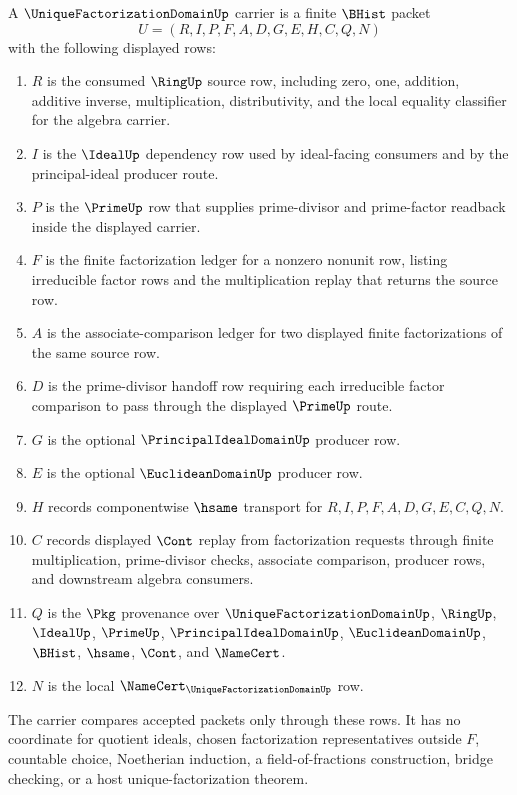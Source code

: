 \begin{definition}
\label{def:unique-factorization-domain-carrier}
A $\UniqueFactorizationDomainUp$ carrier is a finite $\BHist$ packet
$$
U=(R,I,P,F,A,D,G,E,H,C,Q,N)
$$
with the following displayed rows:
\begin{enumerate}
\item $R$ is the consumed $\RingUp$ source row, including zero, one, addition, additive inverse, multiplication, distributivity, and the local equality classifier for the algebra carrier.
\item $I$ is the $\IdealUp$ dependency row used by ideal-facing consumers and by the principal-ideal producer route.
\item $P$ is the $\PrimeUp$ row that supplies prime-divisor and prime-factor readback inside the displayed carrier.
\item $F$ is the finite factorization ledger for a nonzero nonunit row, listing irreducible factor rows and the multiplication replay that returns the source row.
\item $A$ is the associate-comparison ledger for two displayed finite factorizations of the same source row.
\item $D$ is the prime-divisor handoff row requiring each irreducible factor comparison to pass through the displayed $\PrimeUp$ route.
\item $G$ is the optional $\PrincipalIdealDomainUp$ producer row.
\item $E$ is the optional $\EuclideanDomainUp$ producer row.
\item $H$ records componentwise $\hsame$ transport for $R,I,P,F,A,D,G,E,C,Q,N$.
\item $C$ records displayed $\Cont$ replay from factorization requests through finite multiplication, prime-divisor checks, associate comparison, producer rows, and downstream algebra consumers.
\item $Q$ is the $\Pkg$ provenance over $\UniqueFactorizationDomainUp$, $\RingUp$, $\IdealUp$, $\PrimeUp$, $\PrincipalIdealDomainUp$, $\EuclideanDomainUp$, $\BHist$, $\hsame$, $\Cont$, and $\NameCert$.
\item $N$ is the local $\NameCert_{\UniqueFactorizationDomainUp}$ row.
\end{enumerate}
The carrier compares accepted packets only through these rows. It has no coordinate for quotient ideals, chosen factorization representatives outside $F$, countable choice, Noetherian induction, a field-of-fractions construction, bridge checking, or a host unique-factorization theorem.
\end{definition}

